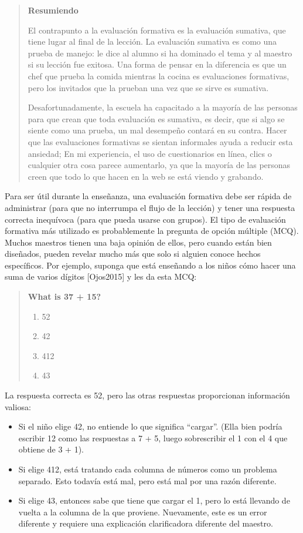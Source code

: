 \documentclass[
]{book}
\providecommand{\tightlist}{%
  \setlength{\itemsep}{0pt}\setlength{\parskip}{0pt}}
\begin{document}
\begin{quote}
\textbf{Resumiendo}

El contrapunto a la evaluación formativa es la evaluación sumativa, que tiene lugar al final de la lección. La evaluación sumativa es como una prueba de manejo: le dice al alumno si ha dominado el tema y al maestro si su lección fue exitosa. Una forma de pensar en la diferencia es que un chef que prueba la comida mientras la cocina es evaluaciones formativas, pero los invitados que la prueban una vez que se sirve es sumativa.

Desafortunadamente, la escuela ha capacitado a la mayoría de las personas para que crean que toda evaluación es sumativa, es decir, que si algo se siente como una prueba, un mal desempeño contará en su contra. Hacer que las evaluaciones formativas se sientan informales ayuda a reducir esta ansiedad; En mi experiencia, el uso de cuestionarios en línea, clics o cualquier otra cosa parece aumentarlo, ya que la mayoría de las personas creen que todo lo que hacen en la web se está viendo y grabando.
\end{quote}

Para ser útil durante la enseñanza, una evaluación formativa debe ser rápida de administrar (para que no interrumpa el flujo de la lección) y tener una respuesta correcta inequívoca (para que pueda usarse con grupos). El tipo de evaluación formativa más utilizado es probablemente la pregunta de opción múltiple (MCQ). Muchos maestros tienen una baja opinión de ellos, pero cuando están bien diseñados, pueden revelar mucho más que solo si alguien conoce hechos específicos. Por ejemplo, suponga que está enseñando a los niños cómo hacer una suma de varios dígitos {[}Ojos2015{]} y les da esta MCQ:

\begin{quote}
\textbf{What is 37 + 15?}

\begin{enumerate}
\def\labelenumi{\alph{enumi})}
\tightlist
\item
  52
\item
  42
\item
  412
\item
  43
\end{enumerate}
\end{quote}

La respuesta correcta es 52, pero las otras respuestas proporcionan información valiosa:

\begin{itemize}
\item
  Si el niño elige 42, no entiende lo que significa ``cargar''. (Ella bien podría escribir 12 como las respuestas a 7 + 5, luego sobrescribir el 1 con el 4 que obtiene de 3 + 1).
\item
  Si elige 412, está tratando cada columna de números como un problema separado. Esto todavía está mal, pero está mal por una razón diferente.
\item
  Si elige 43, entonces sabe que tiene que cargar el 1, pero lo está llevando de vuelta a la columna de la que proviene. Nuevamente, este es un error diferente y requiere una explicación clarificadora diferente del maestro.
\end{itemize}
\end{document}
